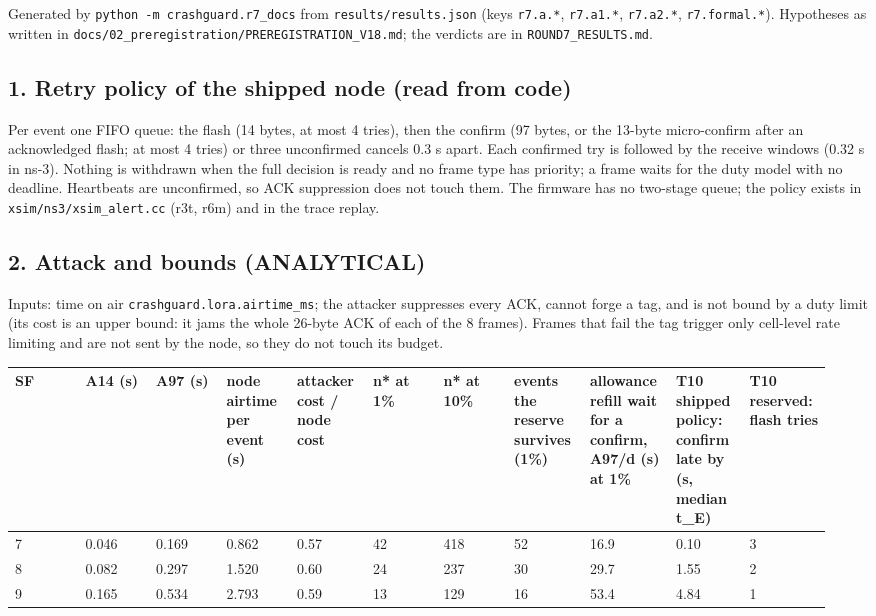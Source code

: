 



Generated by \texttt{python -m crashguard.r7\_docs} from \texttt{results/results.json} (keys \texttt{r7.a.*}, \texttt{r7.a1.*}, \texttt{r7.a2.*}, \texttt{r7.formal.*}). Hypotheses as written in \texttt{docs/02\_preregistration/PREREGISTRATION\_V18.md}; the verdicts are in \texttt{ROUND7\_RESULTS.md}.

\subsection*{1. Retry policy of the shipped node (read from code)}

Per event one FIFO queue: the flash (14 bytes, at most 4 tries), then the confirm (97 bytes, or the 13-byte micro-confirm after an acknowledged flash; at most 4 tries) or three unconfirmed cancels 0.3 s apart. Each confirmed try is followed by the receive windows (0.32 s in ns-3). Nothing is withdrawn when the full decision is ready and no frame type has priority; a frame waits for the duty model with no deadline. Heartbeats are unconfirmed, so ACK suppression does not touch them. The firmware has no two-stage queue; the policy exists in \texttt{xsim/ns3/xsim\_alert.cc} (r3t, r6m) and in the trace replay.

\subsection*{2. Attack and bounds (ANALYTICAL)}

Inputs: time on air \texttt{crashguard.lora.airtime\_ms}; the attacker suppresses every ACK, cannot forge a tag, and is not bound by a duty limit (its cost is an upper bound: it jams the whole 26-byte ACK of each of the 8 frames). Frames that fail the tag trigger only cell-level rate limiting and are not sent by the node, so they do not touch its budget.

{\scriptsize\raggedright
\begin{longtable}{p{0.086\linewidth}p{0.086\linewidth}p{0.086\linewidth}p{0.086\linewidth}p{0.086\linewidth}p{0.086\linewidth}p{0.086\linewidth}p{0.086\linewidth}p{0.086\linewidth}p{0.086\linewidth}p{0.086\linewidth}}
\toprule
SF & A14 (s) & A97 (s) & node airtime per event (s) & attacker cost / node cost & n* at 1\% & n* at 10\% & events the reserve survives (1\%) & allowance refill wait for a confirm, A97/d (s) at 1\% & T10 shipped policy: confirm late by (s, median t\_E) & T10 reserved: flash tries \\
\midrule
\endhead
7 & 0.046 & 0.169 & 0.862 & 0.57 & 42 & 418 & 52 & 16.9 & 0.10 & 3 \\
8 & 0.082 & 0.297 & 1.520 & 0.60 & 24 & 237 & 30 & 29.7 & 1.55 & 2 \\
9 & 0.165 & 0.534 & 2.793 & 0.59 & 13 & 129 & 16 & 53.4 & 4.84 & 1 \\
\bottomrule
\end{longtable}}

